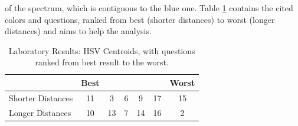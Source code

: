 of the spectrum, which is contiguous to the blue one.
%
Table \ref{table:hsvresults} contains the cited colors and questions, ranked from best (shorter distances) to worst (longer distances) and aims to help the analysis.
%
\begin{table}[htbp]
  \centering
  \begin{tabular}{@{}lcccccc@{}}
  \toprule
      & \multicolumn{1}{l}{Best}                        & \multicolumn{1}{l}{}                            & \multicolumn{1}{l}{}                           & \multicolumn{1}{l}{}                            & \multicolumn{1}{l}{}                            & \multicolumn{1}{l}{Worst}                       \\ \midrule
  \multicolumn{1}{l|}{Shorter Distances} & \multicolumn{1}{c||}{\cellcolor[HTML]{FF8000}11} & \multicolumn{1}{c||}{\cellcolor[HTML]{80FF00}3}  & \multicolumn{1}{c||}{\cellcolor[HTML]{FF8000}6} & \multicolumn{1}{c||}{\cellcolor[HTML]{00FF80}9}  & \multicolumn{1}{c||}{\cellcolor[HTML]{00FF00}17} & \multicolumn{1}{c|}{\cellcolor[HTML]{00FF80}15} \\ \midrule
  \multicolumn{1}{l|}{Longer Distances}  & \multicolumn{1}{c||}{\cellcolor[HTML]{0080FF}10} & \multicolumn{1}{c||}{\cellcolor[HTML]{0080FF}13} & \multicolumn{1}{c||}{\cellcolor[HTML]{0000FF}7} & \multicolumn{1}{c||}{\cellcolor[HTML]{8000FF}14} & \multicolumn{1}{c||}{\cellcolor[HTML]{FF007F}16} & \multicolumn{1}{c|}{\cellcolor[HTML]{FF00FF}2}  \\ \bottomrule
  \end{tabular}
  \caption[Laboratory Results: HSV Centroids]{Laboratory Results: HSV Centroids, with questions ranked from best result to the worst.}
  \label{table:hsvresults}
\end{table}
%

